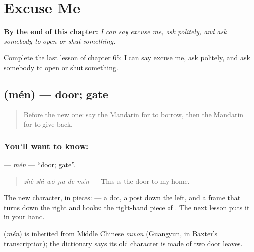 
\chapter{Excuse Me}
\label{ch:zh-excuse-me}

\begin{chapteropening}
\textbf{By the end of this chapter:} \emph{I can say excuse me, ask politely, and ask somebody to open or shut something.}

Complete the last lesson of chapter 65: I can say excuse me, ask politely, and ask somebody to open or shut something.
\end{chapteropening}

\section[\texorpdfstring{\zh{门} (mén)}{门 (mén)}]{ (mén) — door; gate}

\label{lesson:ZH-C65-men}



\begin{quote}
Before the new one: say the Mandarin for to borrow, then the Mandarin for to give back.
\end{quote}

\subsection*{You'll want to know: }
\textbf{} — \emph{mén} — \textquotedblleft{}door; gate\textquotedblright{}.

\begin{quote}
\textbf{} \emph{zhè shì wǒ jiā de mén} — This is the door to my home.
\end{quote}

The new character, in pieces:  — a dot, a post down the left, and a frame that turns down the right and hooks: the right-hand piece of . The next lesson puts it in your hand.

\begin{cousinweb}
\textbf{} (\emph{mén}) is inherited from Middle Chinese \emph{mwon} (Guangyun, in Baxter's transcription); the dictionary says its old character is made of two door leaves.
\end{cousinweb}


